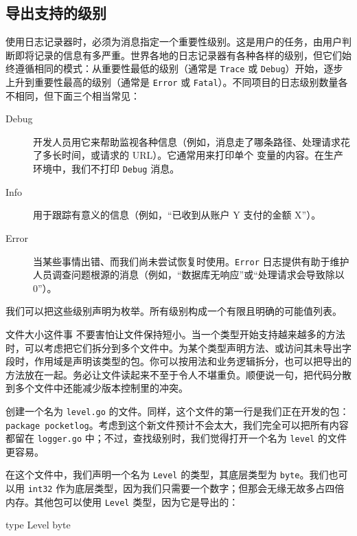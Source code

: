 \subsection{导出支持的级别}

使用日志记录器时，必须为消息指定一个重要性级别。这是用户的任务，由用户判断即将记录的信息有多严重。世界各地的日志记录器有各种各样的级别，但它们始终遵循相同的模式：从重要性最低的级别（通常是 \texttt{Trace} 或 \texttt{Debug}）开始，逐步上升到重要性最高的级别（通常是 \texttt{Error} 或 \texttt{Fatal}）。不同项目的日志级别数量各不相同，但下面三个相当常见：

\begin{description}
  \item[Debug] 开发人员用它来帮助监视各种信息（例如，消息走了哪条路径、处理请求花了多长时间，或请求的 URL）。它通常用来打印单个
变量的内容。在生产环境中，我们不打印 \texttt{Debug} 消息。
  \item[Info] 用于跟踪有意义的信息（例如，“已收到从账户 Y 支付的金额 X”）。
  \item[Error] 当某些事情出错、而我们尚未尝试恢复时使用。\texttt{Error} 日志提供有助于维护人员调查问题根源的消息（例如，“数据库无响应”或“处理请求会导致除以 0”）。
\end{description}

我们可以把这些级别声明为枚举。所有级别构成一个有限且明确的可能值列表。

\begin{infobox}{文件大小这件事}
不要害怕让文件保持短小。当一个类型开始支持越来越多的方法时，可以考虑把它们拆分到多个文件中。为某个类型声明方法、或访问其未导出字段时，作用域是声明该类型的包。你可以按用法和业务逻辑拆分，也可以把导出的方法放在一起。务必让文件读起来不至于令人不堪重负。顺便说一句，把代码分散到多个文件中还能减少版本控制里的冲突。
\end{infobox}

创建一个名为 \texttt{level.go} 的文件。同样，这个文件的第一行是我们正在开发的包：\texttt{package pocketlog}。考虑到这个新文件预计不会太大，我们完全可以把所有内容都留在 \texttt{logger.go} 中；不过，查找级别时，我们觉得打开一个名为 \texttt{level} 的文件更容易。

在这个文件中，我们声明一个名为 \texttt{Level} 的类型，其底层类型为 \texttt{byte}。我们也可以用 \texttt{int32} 作为底层类型，因为我们只需要一个数字；但那会无缘无故多占四倍
内存。其他包可以使用 \texttt{Level} 类型，因为它是导出的：

\begin{gocode}[]
type Level byte
\end{gocode}

